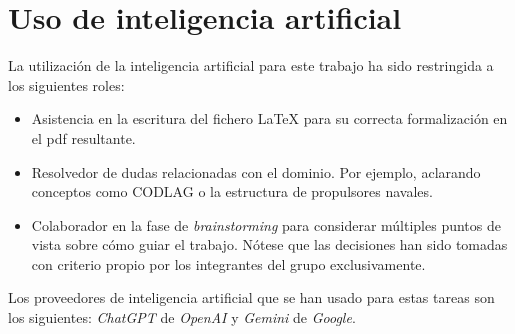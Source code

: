 \documentclass[a4paper]{article}
\begin{document}
\section{Uso de inteligencia artificial}
  La utilización de la inteligencia artificial para este trabajo ha sido restringida a los siguientes roles:
  
  \begin{itemize}
    \item Asistencia en la escritura del fichero LaTeX para su correcta formalización en el pdf resultante.
    \item Resolvedor de dudas relacionadas con el dominio. Por ejemplo, aclarando conceptos como CODLAG o la estructura de propulsores navales.
    \item Colaborador en la fase de \textit{brainstorming} para considerar múltiples puntos de vista sobre cómo guiar el trabajo. Nótese que las decisiones han sido tomadas con criterio propio por los integrantes del grupo exclusivamente.
  \end{itemize}

    Los proveedores de inteligencia artificial que se han usado para estas tareas son los siguientes: \textit{ChatGPT} de \textit{OpenAI} y \textit{Gemini} de \textit{Google}.



\end{document}
